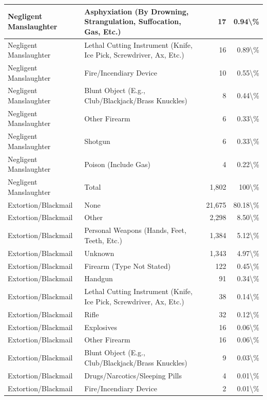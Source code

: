 \documentclass[
]{krantz}
\begin{document}
\begin{longtable}[t]{l|l|r|r}
\hline
Negligent Manslaughter & Asphyxiation (By Drowning, Strangulation, Suffocation, Gas, Etc.) & 17 & 0.94\textbackslash{}\%\\
\hline
Negligent Manslaughter & Lethal Cutting Instrument (Knife, Ice Pick, Screwdriver, Ax, Etc.) & 16 & 0.89\textbackslash{}\%\\
\hline
Negligent Manslaughter & Fire/Incendiary Device & 10 & 0.55\textbackslash{}\%\\
\hline
Negligent Manslaughter & Blunt Object (E.g., Club/Blackjack/Brass Knuckles) & 8 & 0.44\textbackslash{}\%\\
\hline
Negligent Manslaughter & Other Firearm & 6 & 0.33\textbackslash{}\%\\
\hline
Negligent Manslaughter & Shotgun & 6 & 0.33\textbackslash{}\%\\
\hline
Negligent Manslaughter & Poison (Include Gas) & 4 & 0.22\textbackslash{}\%\\
\hline
Negligent Manslaughter & Total & 1,802 & 100\textbackslash{}\%\\
\hline
Extortion/Blackmail & None & 21,675 & 80.18\textbackslash{}\%\\
\hline
Extortion/Blackmail & Other & 2,298 & 8.50\textbackslash{}\%\\
\hline
Extortion/Blackmail & Personal Weapons (Hands, Feet, Teeth, Etc.) & 1,384 & 5.12\textbackslash{}\%\\
\hline
Extortion/Blackmail & Unknown & 1,343 & 4.97\textbackslash{}\%\\
\hline
Extortion/Blackmail & Firearm (Type Not Stated) & 122 & 0.45\textbackslash{}\%\\
\hline
Extortion/Blackmail & Handgun & 91 & 0.34\textbackslash{}\%\\
\hline
Extortion/Blackmail & Lethal Cutting Instrument (Knife, Ice Pick, Screwdriver, Ax, Etc.) & 38 & 0.14\textbackslash{}\%\\
\hline
Extortion/Blackmail & Rifle & 32 & 0.12\textbackslash{}\%\\
\hline
Extortion/Blackmail & Explosives & 16 & 0.06\textbackslash{}\%\\
\hline
Extortion/Blackmail & Other Firearm & 16 & 0.06\textbackslash{}\%\\
\hline
Extortion/Blackmail & Blunt Object (E.g., Club/Blackjack/Brass Knuckles) & 9 & 0.03\textbackslash{}\%\\
\hline
Extortion/Blackmail & Drugs/Narcotics/Sleeping Pills & 4 & 0.01\textbackslash{}\%\\
\hline
Extortion/Blackmail & Fire/Incendiary Device & 2 & 0.01\textbackslash{}\%\\

\end{longtable}
\end{document}
